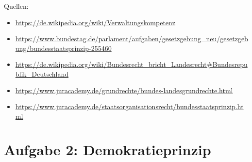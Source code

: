 \documentclass{article}
\begin{document}
	Quellen:
	\begin{itemize}
		\item \url{https://de.wikipedia.org/wiki/Verwaltungskompetenz}
		\item \url{https://www.bundestag.de/parlament/aufgaben/gesetzgebung_neu/gesetzgebung/bundesstaatsprinzip-255460}
		\item \url{https://de.wikipedia.org/wiki/Bundesrecht_bricht_Landesrecht#Bundesrepublik_Deutschland}
		\item \url{https://www.juracademy.de/grundrechte/bundes-landesgrundrechte.html}
		\item \url{https://www.juracademy.de/staatsorganisationsrecht/bundesstaatsprinzip.html}
	\end{itemize}

	\section{Aufgabe 2: Demokratieprinzip}
\end{document}
